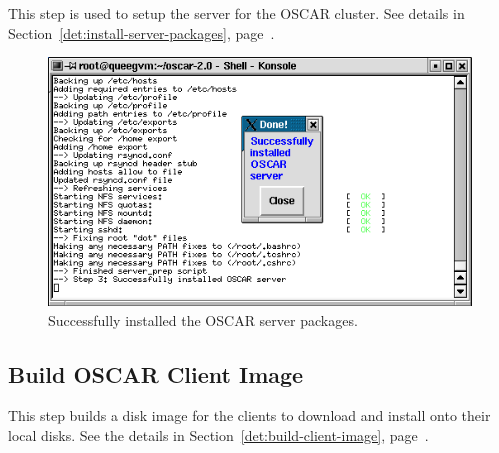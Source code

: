 This step is used to setup the server for the OSCAR cluster.  See
details in Section~\ref{det:install-server-packages},
page~\pageref{det:install-server-packages}.

\begin{figure}[hb!]
  \begin{center}
    \includegraphics[scale=\imgscale]{figs/install-server-pkgs-done}
    \caption{Successfully installed the OSCAR server packages.}
    \label{fig:sbs-install-wizard-s1}
  \end{center}
\end{figure}



\subsection{Build OSCAR Client Image}

This step builds a disk image for the clients to download and install
onto their local disks.  See the details in
Section~\ref{det:build-client-image},
page~\pageref{det:build-client-image}.

